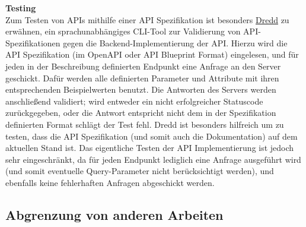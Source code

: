 \textbf{Testing}\\
Zum Testen von APIs mithilfe einer API Spezifikation ist besonders \href{http://dredd.io/}{Dredd} zu erwähnen, ein sprachunabhängiges CLI-Tool zur Validierung von API-Spezifikationen gegen die Backend-Implementierung der API. Hierzu wird die API Spezifikation (im OpenAPI oder API Blueprint Format) eingelesen, und für jeden in der Beschreibung definierten Endpunkt eine Anfrage an den Server geschickt. Dafür werden alle definierten Parameter und Attribute mit ihren entsprechenden Beispielwerten benutzt. Die Antworten des Servers werden anschließend validiert; wird entweder ein nicht erfolgreicher Statuscode zurückgegeben, oder die Antwort entspricht nicht dem in der Spezifikation definierten Format schlägt der Test fehl. Dredd ist besonders hilfreich um zu testen, dass die API Spezifikation (und somit auch die Dokumentation) auf dem aktuellen Stand ist. Das eigentliche Testen der API Implementierung ist jedoch sehr eingeschränkt, da für jeden Endpunkt lediglich eine Anfrage ausgeführt wird (und somit eventuelle Query-Parameter nicht berücksichtigt werden), und ebenfalls keine fehlerhaften Anfragen abgeschickt werden.

\subsection{Abgrenzung von anderen Arbeiten}